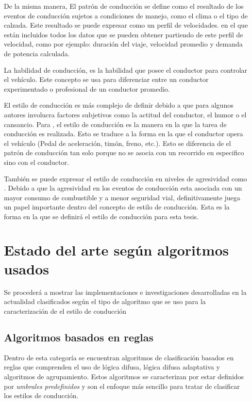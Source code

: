 De la misma manera, El patrón de conducción se define como el resultado de los eventos de conducción sujetos a condiciones de manejo, como el clima o el tipo de calzada. Este resultado se puede expresar como un perfil de velocidades. en el que están incluidos todos los datos que se pueden obtener partiendo de este perfil de velocidad, como por ejemplo: duración del viaje, velocidad promedio y demanda de potencia calculada.

La habilidad de conducción, es la habilidad que posee el conductor para controlar el vehículo. Este concepto se usa para diferenciar entre un conductor experimentado o profesional de un conductor promedio.

El estilo de conducción es más complejo de definir debido a que para algunos autores involucra factores subjetivos como la actitud del conductor, el humor o el cansancio. Para \citeauthor{6957822} \cite{6957822}, el estilo de conducción  es la manera en la que la tarea de conducción es realizada. Esto se traduce a la forma en la que el conductor opera el vehículo (Pedal de aceleración, timón, freno, etc.). Esto se diferencia de el patrón de conducción tan solo porque no se asocia con un recorrido en especifico sino con el conductor.

También se puede expresar el estilo de conducción en niveles de agresividad como \citeauthor{6294318} \cite{6294318}. Debido a que la agresividad en los eventos de conducción esta asociada con un mayor consumo de combustible y a menor seguridad vial, definitivamente juega un papel importante dentro del concepto de estilo de conducción. Esta es la forma en la que se definirá el estilo de conducción para esta tesis.

\section{Estado del arte según algoritmos usados}
Se procederá a mostrar las implementaciones e investigaciones desarrolladas en la actualidad clasificados según el tipo de algoritmo que se uso para la caracterización de el estilo de conducción

\subsection{Algoritmos basados en reglas}
Dentro de esta categoría se encuentran algoritmos de clasificación basados en reglas que comprenden el uso de lógica difusa, lógica difusa adaptativa y algoritmos de agrupamiento. Estos algoritmos se caracterizan por estar definidos por {\it umbrales predefinidos} y son el enfoque más sencillo para tratar de clasificar los estilos de conducción.

